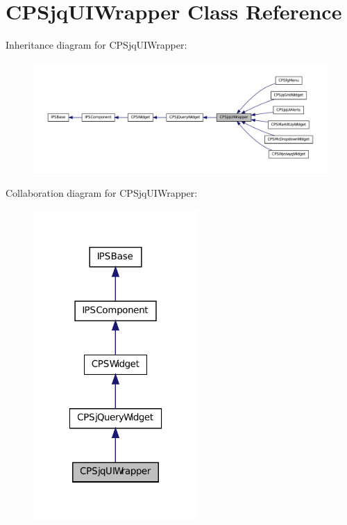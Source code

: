 \hypertarget{classCPSjqUIWrapper}{
\section{CPSjqUIWrapper Class Reference}
\label{classCPSjqUIWrapper}
}


Inheritance diagram for CPSjqUIWrapper:\nopagebreak
\begin{figure}[H]
\begin{center}
\leavevmode
\includegraphics[width=400pt]{classCPSjqUIWrapper__inherit__graph}
\end{center}
\end{figure}


Collaboration diagram for CPSjqUIWrapper:\nopagebreak
\begin{figure}[H]
\begin{center}
\leavevmode
\includegraphics[width=178pt]{classCPSjqUIWrapper__coll__graph}
\end{center}
\end{figure}
